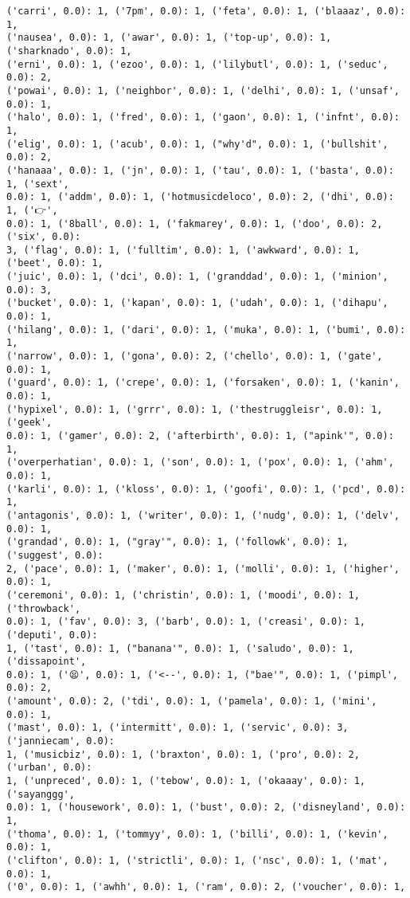 \documentclass[11pt]{article}
\begin{document}
\begin{Verbatim}[commandchars=\\\{\}]
('carri', 0.0): 1, ('7pm', 0.0): 1, ('feta', 0.0): 1, ('blaaaz', 0.0): 1,
('nausea', 0.0): 1, ('awar', 0.0): 1, ('top-up', 0.0): 1, ('sharknado', 0.0): 1,
('erni', 0.0): 1, ('ezoo', 0.0): 1, ('lilybutl', 0.0): 1, ('seduc', 0.0): 2,
('powai', 0.0): 1, ('neighbor', 0.0): 1, ('delhi', 0.0): 1, ('unsaf', 0.0): 1,
('halo', 0.0): 1, ('fred', 0.0): 1, ('gaon', 0.0): 1, ('infnt', 0.0): 1,
('elig', 0.0): 1, ('acub', 0.0): 1, ("why'd", 0.0): 1, ('bullshit', 0.0): 2,
('hanaaa', 0.0): 1, ('jn', 0.0): 1, ('tau', 0.0): 1, ('basta', 0.0): 1, ('sext',
0.0): 1, ('addm', 0.0): 1, ('hotmusicdeloco', 0.0): 2, ('dhi', 0.0): 1, ('👉',
0.0): 1, ('8ball', 0.0): 1, ('fakmarey', 0.0): 1, ('doo', 0.0): 2, ('six', 0.0):
3, ('flag', 0.0): 1, ('fulltim', 0.0): 1, ('awkward', 0.0): 1, ('beet', 0.0): 1,
('juic', 0.0): 1, ('dci', 0.0): 1, ('granddad', 0.0): 1, ('minion', 0.0): 3,
('bucket', 0.0): 1, ('kapan', 0.0): 1, ('udah', 0.0): 1, ('dihapu', 0.0): 1,
('hilang', 0.0): 1, ('dari', 0.0): 1, ('muka', 0.0): 1, ('bumi', 0.0): 1,
('narrow', 0.0): 1, ('gona', 0.0): 2, ('chello', 0.0): 1, ('gate', 0.0): 1,
('guard', 0.0): 1, ('crepe', 0.0): 1, ('forsaken', 0.0): 1, ('kanin', 0.0): 1,
('hypixel', 0.0): 1, ('grrr', 0.0): 1, ('thestruggleisr', 0.0): 1, ('geek',
0.0): 1, ('gamer', 0.0): 2, ('afterbirth', 0.0): 1, ("apink'", 0.0): 1,
('overperhatian', 0.0): 1, ('son', 0.0): 1, ('pox', 0.0): 1, ('ahm', 0.0): 1,
('karli', 0.0): 1, ('kloss', 0.0): 1, ('goofi', 0.0): 1, ('pcd', 0.0): 1,
('antagonis', 0.0): 1, ('writer', 0.0): 1, ('nudg', 0.0): 1, ('delv', 0.0): 1,
('grandad', 0.0): 1, ("gray'", 0.0): 1, ('followk', 0.0): 1, ('suggest', 0.0):
2, ('pace', 0.0): 1, ('maker', 0.0): 1, ('molli', 0.0): 1, ('higher', 0.0): 1,
('ceremoni', 0.0): 1, ('christin', 0.0): 1, ('moodi', 0.0): 1, ('throwback',
0.0): 1, ('fav', 0.0): 3, ('barb', 0.0): 1, ('creasi', 0.0): 1, ('deputi', 0.0):
1, ('tast', 0.0): 1, ("banana'", 0.0): 1, ('saludo', 0.0): 1, ('dissapoint',
0.0): 1, ('😫', 0.0): 1, ('<--', 0.0): 1, ("bae'", 0.0): 1, ('pimpl', 0.0): 2,
('amount', 0.0): 2, ('tdi', 0.0): 1, ('pamela', 0.0): 1, ('mini', 0.0): 1,
('mast', 0.0): 1, ('intermitt', 0.0): 1, ('servic', 0.0): 3, ('janniecam', 0.0):
1, ('musicbiz', 0.0): 1, ('braxton', 0.0): 1, ('pro', 0.0): 2, ('urban', 0.0):
1, ('unpreced', 0.0): 1, ('tebow', 0.0): 1, ('okaaay', 0.0): 1, ('sayanggg',
0.0): 1, ('housework', 0.0): 1, ('bust', 0.0): 2, ('disneyland', 0.0): 1,
('thoma', 0.0): 1, ('tommyy', 0.0): 1, ('billi', 0.0): 1, ('kevin', 0.0): 1,
('clifton', 0.0): 1, ('strictli', 0.0): 1, ('nsc', 0.0): 1, ('mat', 0.0): 1,
('0', 0.0): 1, ('awhh', 0.0): 1, ('ram', 0.0): 2, ('voucher', 0.0): 1,

\end{Verbatim}
\end{document}
